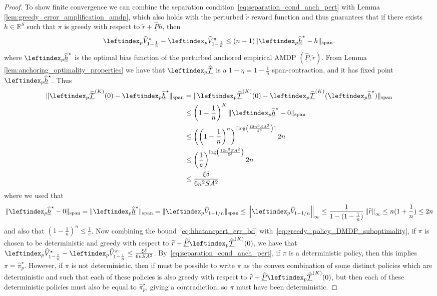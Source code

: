 \documentclass{article}
\theoremstyle{plain}
\theoremstyle{plain}
\theoremstyle{remark}
\theoremstyle{plain}
\theoremstyle{plain}
\newcommand{\R}{\mathbb{R}}
\newcommand{\Phat}{\widehat{P}}
\newcommand{\Vhat}{\widehat{V}}
\newcommand{\pihat}{\widehat{\pi}}
\newcommand{\hhat}{\widehat{h}}
\newcommand{\Phatanc}{\underline{\Phat}}
\newcommand{\hhatanc}{\underline{\hhat}}
\newcommand{\Vhatpert}{\leftindex_p{\Vhat}}
\newcommand{\pihatpert}{\pihat^\star_p}
\newcommand{\Thatancpert}{\leftindex_p{\underline{\widehat{\mathcal{T}}}} }
\newcommand{\hhatancpert}{\leftindex_p{\hhatanc}}
\begin{document}
\begin{proof}
To show finite convergence we can combine the separation condition~\eqref{eq:separation_cond_anch_pert} with Lemma \ref{lem:greedy_error_amplification_amdp}, which also holds with the perturbed $\widetilde{r}$ reward function and thus guarantees that if there exists $h\in \R^S $ such that $\pi$ is greedy with respect to $\widetilde{r} + \Phatanc h$, then
    \begin{align}
        \Vhatpert_{1-\frac{1}{n}}^\star - \Vhatpert_{1-\frac{1}{n}}^\pi \leq (n-1)\spannorm{\hhatancpert^\star - h}. \label{eq:greedy_policy_DMDP_suboptimality}
    \end{align}
where $\hhatancpert^\star$ is the optimal bias function of the perturbed anchored empirical AMDP $(\Phatanc, \widetilde{r})$. From Lemma \ref{lem:anchoring_optimality_properties} we have that $\Thatancpert$ is a $1 - \eta = 1 - \frac{1}{n}$ span-contraction, and it has fixed point $\hhatancpert^\star$. Thus
\begin{align}
    \spannorm{\Thatancpert^{(K)}(0) - \hhatancpert^\star} &= \spannorm{\Thatancpert^{(K)}(0) - \Thatancpert^{(K)}(\hhatancpert^\star)} \nonumber\\
    & \leq \left(1 - \frac{1}{n} \right)^{K} \spannorm{\hhatancpert^\star - 0} \nonumber \\
    & \leq \left( \left(1 - \frac{1}{n} \right)^{n} \right)^{\lceil \log\left( \frac{12 n^3 S A^2}{\xi \delta}\right) \rceil} 2n \nonumber \\
    & \leq \left( \frac{1}{e}\right)^{ \log\left( \frac{12 n^3 S A^2}{\xi \delta}\right) } 2n \nonumber \\
    & \leq \frac{\xi \delta}{6 n^2 S A^2} \label{eq:hhatancpert_err_bd}
\end{align}
where we used that
\[
\spannorm{\hhatancpert^\star - 0} = \spannorm{\hhatancpert^\star} = \spannorm{\Vhatpert_{1-1/n}} \leq \infnorm{\Vhatpert_{1-1/n}} \leq \frac{1}{1-(1-\frac{1}{n})} \infnorm{\widetilde{r}} \leq n (1 + \frac{1}{n}) \leq 2n
\]
and also that $(1-\frac{1}{n})^n \leq \frac{1}{e}$. Now combining the bound~\eqref{eq:hhatancpert_err_bd} with~\eqref{eq:greedy_policy_DMDP_suboptimality}, if $\pi$ is chosen to be deterministic and greedy with respect to $\widetilde{r} + \Phatanc \Thatancpert^{(K)}(0)$, we have that $\Vhatpert_{1-\frac{1}{n}}^\star - \Vhatpert^{\pi}_{1-\frac{1}{n}} \leq \frac{\xi \delta}{6 n S A^2}$.
By~\eqref{eq:separation_cond_anch_pert}, if $\pi$ is a deterministic policy, then this implies $\pi = \pihatpert$. However, if $\pi$ is not deterministic, then if must be possible to write $\pi$ as the convex combination of some distinct policies which are deterministic and such that each of these policies is also greedy with respect to $\widetilde{r } + \Phatanc \Thatancpert^{(K)}(0)$, but then each of these deterministic policies must also be equal to $ \pihatpert$, giving a contradiction, so $\pi$ must have been deterministic.
\end{proof}
\end{document}
